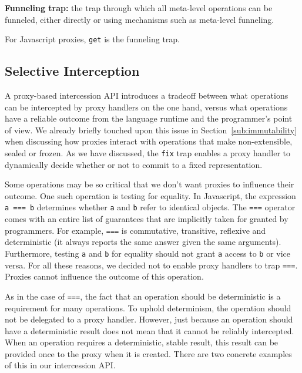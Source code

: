 \documentclass{acm_proc_article-sp}
\begin{document}
\textbf{Funneling trap:} the trap through which all meta-level operations can be funneled, either directly or using mechanisms such as meta-level funneling.

For Javascript proxies, \texttt{get} is the funneling trap.

\subsection{Selective Interception}
\label{sub:selective}

A proxy-based intercession API introduces a tradeoff between what operations can be intercepted by proxy handlers on the one hand, versus what operations have a reliable outcome from the language runtime and the programmer's point of view. We already briefly touched upon this issue in Section~\ref{sub:immutability} when discussing how proxies interact with operations that make non-extensible, sealed or frozen. As we have discussed, the \texttt{fix} trap enables a proxy handler to dynamically decide whether or not to commit to a fixed representation.

Some operations may be so critical that we don't want proxies to influence their outcome. One such operation is testing for equality. In Javascript, the expression \texttt{a === b} determines whether \texttt{a} and \texttt{b} refer to identical objects. The \texttt{===} operator comes with an entire list of guarantees that are implicitly taken for granted by programmers. For example, \texttt{===} is commutative, transitive, reflexive and deterministic (it always reports the same answer given the same arguments). Furthermore, testing \texttt{a} and \texttt{b} for equality should not grant \texttt{a} access to \texttt{b} or vice versa. For all these reasons, we decided not to enable proxy handlers to trap \texttt{===}. Proxies cannot influence the outcome of this operation.

As in the case of \texttt{===}, the fact that an operation should be deterministic is a requirement for many operations. To uphold determinism, the operation should not be delegated to a proxy handler. However, just because an operation should have a deterministic result does not mean that it cannot be reliably intercepted. When an operation requires a deterministic, stable result, this result can be provided once to the proxy when it is created. There are two concrete examples of this in our intercession API.
\end{document}
